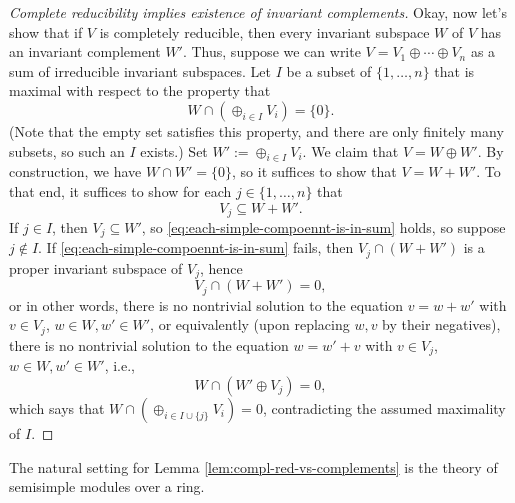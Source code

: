 \documentclass[reqno]{amsart} 
\begin{document}
\begin{proof}
[Complete reducibility implies  existence of invariant complements]
  Okay, now let's show that if $V$ is completely reducible, then
  every invariant subspace $W$ of $V$ has an invariant
  complement $W'$.
  Thus, suppose we can write
  $V = V_1 \oplus \dotsb \oplus V_n$
  as a sum of irreducible invariant subspaces.
  Let $I$ be a subset of $\{1,\dotsc,n\}$  that is maximal
  with respect to the property
  that
  \begin{equation*}
    W
    \cap (\oplus_{i \in I} V_i) = \{0\}.
  \end{equation*}
  (Note that the empty set satisfies this property,
  and there are only finitely many subsets, so such an $I$ exists.)
  Set $W' := \oplus_{i \in I} V_i$.
  We claim that $V = W \oplus W'$.
  By construction, we have $W \cap W' = \{0\}$,
  so it suffices to show that $V = W + W'$.
  To that end, it suffices to show for each
  $j \in \{1,\dotsc,n\}$ that
  \begin{equation}\label{eq:each-simple-compoennt-is-in-sum}
    V_j \subseteq W + W'.
  \end{equation}
  If $j \in I$, then $V_j \subseteq W'$,
  so \ref{eq:each-simple-compoennt-is-in-sum} holds,
  so suppose $j \notin I$.
  If
  \eqref{eq:each-simple-compoennt-is-in-sum}
  fails, then $V_j \cap (W + W')$ is a proper invariant subspace of $V_j$,
  hence
  \begin{equation*}
V_j \cap (W + W') = 0,
  \end{equation*}
  or in other words,
  there is no nontrivial solution to the equation
  $v = w + w'$ with $v \in V_j$, $w \in W, w' \in W'$,
  or equivalently (upon replacing $w,v$ by their negatives),
  there is no nontrivial solution
  to the equation
  $w = w' + v$ with $v \in V_j$, $w \in W, w' \in W'$,
  i.e.,
  \begin{equation*}
    W \cap (W' \oplus V_j) = 0,
  \end{equation*}
  which says that
  $W \cap (\oplus_{i \in I \cup \{j\}} V_i) = 0$,
  contradicting the assumed maximality of $I$.
\end{proof}
\begin{remark}
  The natural setting for Lemma \ref{lem:compl-red-vs-complements} is the theory
  of semisimple modules over a ring.
\end{remark}
\end{document}
